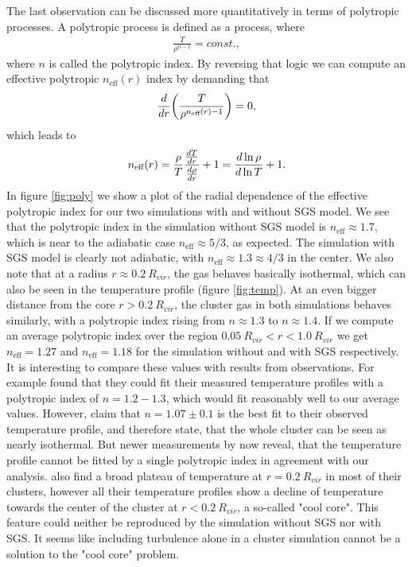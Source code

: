 The last observation can be discussed more quantitatively in terms of
polytropic processes. A polytropic process is defined as a process, where
\begin{align}
\frac{T}{\rho^{n-1}} = const.,
\end{align}
where $n$ is called the polytropic index. By reversing that logic we can
compute an effective polytropic $n_{\text{eff}}(r)$ index by demanding that
\begin{align}
\td{r}\lra{\frac{T}{\rho^{n_{\text{eff}}(r)-1}}}=0,
\end{align}
which leads to
\begin{align}
n_{\text{eff}}(r)=\frac{\rho}{T}\frac{\ttd{r}{T}}{\ttd{r}{\rho}}+1
=\ttd{\ln T}{\ln \rho}+1. 
\end{align}
In figure \ref{fig:poly}
we show a plot of the radial dependence of the effective
polytropic index for our two simulations with and without SGS model. 
We see that the polytropic index in the simulation without SGS
model is $n_{\text{eff}} \approx 1.7$, which is near to the adiabatic case
$n_{\text{eff}} \approx 5/3$, as expected. The simulation with SGS model is
clearly not
adiabatic, with $n_{\text{eff}} \approx 1.3 \approx 4/3$ in the center. We
also note that at a radius $r \approx 0.2\ R_{vir}$, the gas behaves
basically
isothermal, which can also be seen in the temperature profile
(figure \ref{fig:temp}). At an even bigger distance from the core 
$r > 0.2\ R_{vir}$, the cluster gas in both simulations behaves similarly,
with a
polytropic index rising from $n \approx 1.3$ to $n \approx 1.4$. 
If we compute an average polytropic index over the region 
$0.05\ R_{vir} < r < 1.0\ R_{vir}$ we get $n_{\text{eff}} = 1.27$
and $n_{\text{eff}} = 1.18$
for the simulation without and with SGS respectively. It is
interesting to compare these values with results from observations. For example 
\citet{Markevitch1998} found that they could fit their measured temperature
profiles with a polytropic index of $n=1.2-1.3$, which would fit reasonably
well to our average values. However, \citet{Pratt2002} claim that 
$n=1.07 \pm 0.1$ is the best fit to their observed temperature profile, and
therefore state, that the whole cluster can be seen as nearly isothermal.
But newer measurements by \citet{Vikhlinin2006} now reveal, that the
temperature profile cannot be fitted by a single polytropic index in agreement
with our analysis. \citet{Vikhlinin2006} also find a broad plateau of
temperature at $r=0.2\ R_{vir}$ in most of their clusters, however all
their
temperature profiles show a decline of temperature towards the center of the
cluster at $r < 0.2\ R_{vir}$, a so-called "cool core". This feature
could
neither be reproduced by the simulation without SGS nor with SGS. It seems like
including turbulence alone in a cluster simulation cannot be a solution to the
"cool core" problem. 

